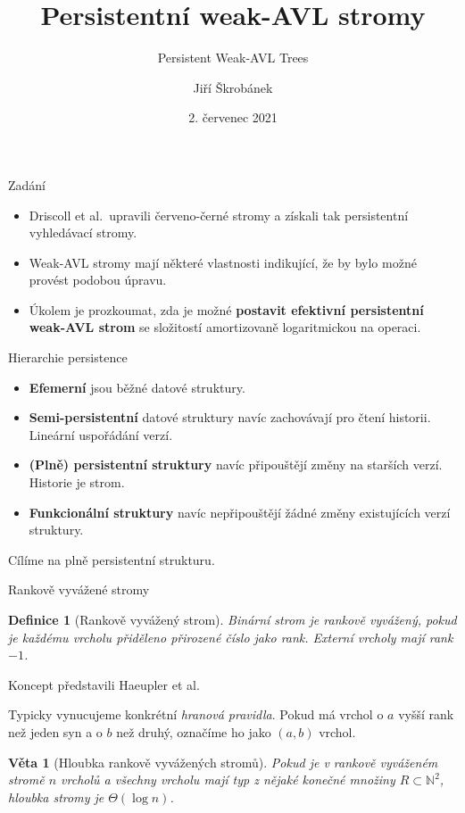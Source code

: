\documentclass{beamer}
\title{Persistentní weak-AVL stromy}
\subtitle{Persistent Weak-AVL Trees}
\author
{Jiří Škrobánek}
\date{2. červenec 2021}
\theoremstyle{mytheoremstyle}
\newtheorem{dfn}{Definice}
\newtheorem{thm}{Věta}
\begin{document}
\begin{frame}
  \titlepage
\end{frame}

\begin{frame}{Zadání}
\begin{itemize}
\item
Driscoll et al.~upravili červeno-černé stromy a získali tak persistentní vyhledávací stromy.
\item
Weak-AVL stromy mají některé vlastnosti indikující, že by bylo možné provést podobou úpravu.
\item
Úkolem je prozkoumat, zda je možné {\bf postavit efektivní persistentní weak-AVL strom} se složitostí amortizovaně logaritmickou na operaci.
\end{itemize}
\end{frame}


\begin{frame}{Hierarchie persistence}
\begin{itemize}
  \item \textbf{Efemerní} jsou běžné datové struktury.
  \item \textbf{Semi-persistentní} datové struktury navíc zachovávají pro čtení historii. Lineární uspořádání verzí.
  \item \textbf{(Plně) persistentní struktury} navíc připouštějí změny na starších verzí. Historie je strom.
  \item \textbf{Funkcionální struktury} navíc nepřipouštějí žádné změny existujících verzí struktury. 
\end{itemize}
Cílíme na plně persistentní strukturu.
\end{frame}



\begin{frame}{Rankově vyvážené stromy}
\begin{dfn}[Rankově vyvážený strom]
Binární strom je rankově vyvážený, pokud je každému vrcholu přiděleno přirozené číslo jako \emph{rank}. Externí vrcholy mají rank $-1$.
\end{dfn}
Koncept představili Haeupler et al.

\pause

Typicky vynucujeme konkrétní \emph{hranová pravidla}. Pokud má vrchol o $a$ vyšší rank než jeden syn a o $b$ než druhý, označíme ho jako $(a,b)$ vrchol.

\pause

\begin{thm}[Hloubka rankově vyvážených stromů]
Pokud je v rankově vyváženém stromě $n$ vrcholů a všechny vrcholu mají typ z nějaké konečné množiny $R \subset \mathbb{N}^2$, hloubka stromy je $\Theta(\log n)$.
\end{thm}
\end{frame}
\end{document}
